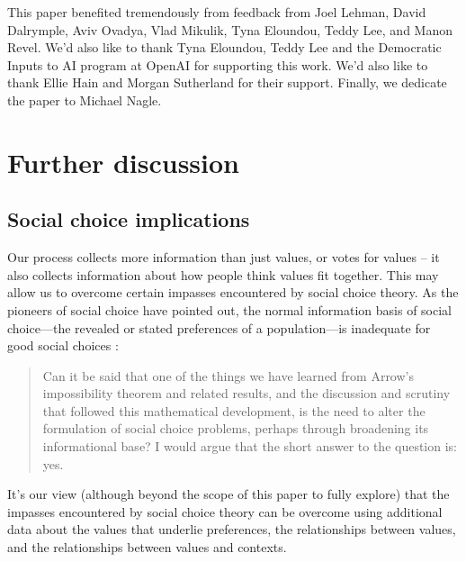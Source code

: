 \documentclass{article}
\theoremstyle{definition}
\begin{document}
\begin{ack}
This paper benefited tremendously from feedback from Joel Lehman, David Dalrymple, Aviv Ovadya, Vlad Mikulik, Tyna Eloundou, Teddy Lee, and Manon Revel. We’d also like to thank Tyna Eloundou, Teddy Lee and the Democratic Inputs to AI program at OpenAI for supporting this work. We’d also like to thank Ellie Hain and Morgan Sutherland for their support. Finally, we dedicate the paper to Michael Nagle.


\end{ack}





\newpage

\appendix
\section{Further discussion}\label{sec:appendix}

\subsection{Social choice implications
}\label{sec:a_social_choice_implications}

Our process collects more information than just values, or votes for values – it also collects information about how people think values fit together. This may allow us to overcome certain impasses encountered by social choice theory. As the pioneers of social choice have pointed out, the normal information basis of social choice—the revealed or stated preferences of a population—is inadequate for good social choices \citep{CollectiveChoiceSocialWelfare}:

\begin{quote}
Can it be said that one of the things we have learned from Arrow’s impossibility theorem and related results, and the discussion and scrutiny that followed this mathematical development, is the need to alter the formulation of social choice problems, perhaps through broadening its informational base? I would argue that the short answer to the question is: yes.
\end{quote}

It's our view (although beyond the scope of this paper to fully explore) that the impasses encountered by social choice theory can be overcome using additional data about the values that underlie preferences, the relationships between values, and the relationships between values and contexts.
\end{document}
